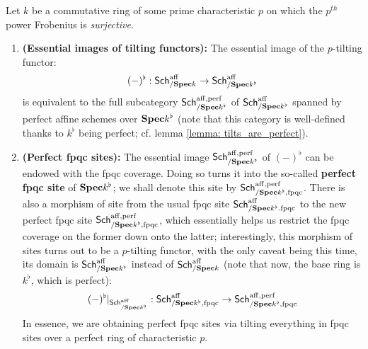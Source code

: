                 \begin{lemma} \label{lemma: perfect_fpqc_sites}
                    Let $k$ be a commutative ring of some prime characteristic $p$ on which the $p^{th}$ power Frobenius is \textit{surjective}.
                        \begin{enumerate}
                            \item \textbf{(Essential images of tilting functors):} The essential image of the $p$-tilting functor:
                                $$(-)^{\flat}: \mathsf{Sch}^{\mathrm{aff}}_{/\mathbf{Spec} k} \to \mathsf{Sch}^{\mathrm{aff}}_{/\mathbf{Spec} k^{\flat}}$$
                            is equivalent to the full subcategory $\mathsf{Sch}^{\mathrm{aff}, \mathrm{perf}}_{/\mathbf{Spec} k^{\flat}}$ of $\mathsf{Sch}^{\mathrm{aff}}_{/\mathbf{Spec} k^{\flat}}$ spanned by perfect affine schemes over $\mathbf{Spec} k^{\flat}$ (note that this category is well-defined thanks to $k^{\flat}$ being perfect; cf. lemma \ref{lemma: tilts_are_perfect}).
                            \item \textbf{(Perfect fpqc sites):} The essential image $\mathsf{Sch}^{\mathrm{aff}, \mathrm{perf}}_{/\mathbf{Spec} k^{\flat}}$ of $(-)^{\flat}$ can be endowed with the fpqc coverage. Doing so turns it into the so-called \textbf{perfect fpqc site} of $\mathbf{Spec} k^{\flat}$; we shall denote this site by $\mathsf{Sch}^{\mathrm{aff}, \mathrm{perf}}_{/\mathbf{Spec} k^{\flat}, \mathrm{fpqc}}$. There is also a morphism of site from the usual fpqc site $\mathsf{Sch}^{\mathrm{aff}}_{/\mathbf{Spec} k^{\flat}. \mathrm{fpqc}}$ to the new perfect fpqc site $\mathsf{Sch}^{\mathrm{aff}, \mathrm{perf}}_{/\mathbf{Spec} k^{\flat}, \mathrm{fpqc}}$, which essentially helps us restrict the fpqc coverage on the former down onto the latter; interestingly, this morphism of sites turns out to be a $p$-tilting functor, with the only caveat being this time, its domain is $\mathsf{Sch}^{\mathrm{aff}}_{/\mathbf{Spec} k^{\flat}}$ instead of $\mathsf{Sch}^{\mathrm{aff}}_{/\mathbf{Spec} k}$ (note that now, the base ring is $k^{\flat}$, which is perfect):
                                $$(-)^{\flat}|_{\mathsf{Sch}^{\mathrm{aff}}_{/\mathbf{Spec} k^{\flat}}}: \mathsf{Sch}^{\mathrm{aff}}_{/\mathbf{Spec} k^{\flat}, \mathrm{fpqc}} \to \mathsf{Sch}^{\mathrm{aff}, \mathrm{perf}}_{/\mathbf{Spec} k^{\flat}, \mathrm{fpqc}}$$
                            In essence, we are obtaining perfect fpqc sites via tilting everything in fpqc sites over a perfect ring of characteristic $p$.
                        \end{enumerate}
                \end{lemma}
